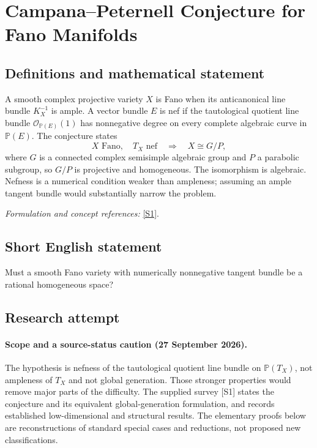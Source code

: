 \documentclass[11pt]{article}
\begin{document}
\section*{\texorpdfstring{Campana–Peternell Conjecture for Fano Manifolds}{Campana–Peternell Conjecture for Fano Manifolds}}\label{statement}
\subsection{Definitions and mathematical statement}
A smooth complex projective variety $X$ is Fano when its anticanonical line bundle $K_X^{-1}$ is ample. A vector bundle $E$ is nef if the tautological quotient line bundle $\mathcal O_{{\mathbb{P}}(E)}(1)$ has nonnegative degree on every complete algebraic curve in ${\mathbb{P}}(E)$. The conjecture states
\[
 X\text{ Fano},\quad T_X\text{ nef}
 \quad\Longrightarrow\quad X\cong G/P,
\]
where $G$ is a connected complex semisimple algebraic group and $P$ a parabolic subgroup, so $G/P$ is projective and homogeneous. The isomorphism is algebraic. Nefness is a numerical condition weaker than ampleness; assuming an ample tangent bundle would substantially narrow the problem.
\par\smallskip\textit{Formulation and concept references:} \href{https://arxiv.org/abs/1407.6483}{[S1]}.

\subsection{Short English statement}
Must a smooth Fano variety with numerically nonnegative tangent bundle be a rational homogeneous space?
\subsection{Research attempt}

\paragraph{Scope and a source-status caution (27 September 2026).}
The hypothesis is nefness of the tautological quotient line bundle on
$\mathbb P(T_X)$, not ampleness of $T_X$ and not global generation.
Those stronger properties would remove major parts of the difficulty.
The supplied survey [S1] states the conjecture and its equivalent
global-generation formulation, and records established low-dimensional
and structural results. The elementary proofs below are reconstructions
of standard special cases and reductions, not proposed new classifications.
\end{document}
